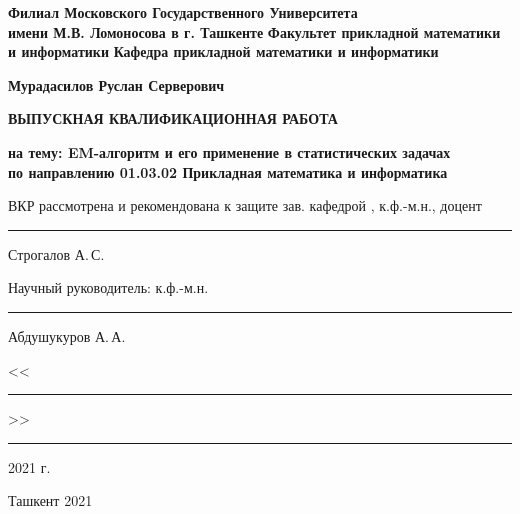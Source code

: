 \begin{titlepage}
\begin{center}
        
\textbf{Филиал Московского Государственного Университета\\
имени М.В. Ломоносова в г. Ташкенте} \vskip 0.3cm
\textbf{Факультет прикладной математики и информатики} \vskip 0.3cm
\textbf{Кафедра прикладной математики и информатики} \vskip 3cm
            
\textbf{Мурадасилов Руслан Серверович} \vskip 1cm
            
\textbf{ВЫПУСКНАЯ КВАЛИФИКАЦИОННАЯ РАБОТА} \vskip 1cm
            
\normalsize { \textbf{на тему: \guillemotleft EM-алгоритм и его применение в статистических задачах\guillemotright \\ \vskip 0.5cm
по направлению 01.03.02 \guillemotleft Прикладная математика и информатика\guillemotright} }
\vskip 1.5cm
\end{center}

\begin{flushleft}
ВКР рассмотрена и рекомендована к защите \vskip 5pt
зав. кафедрой \guillemotright, к.ф.-м.н., доцент\rule{3.2cm}{0.5pt} Строгалов А.\,С.
\end{flushleft}
\begin{flushleft}
Научный руководитель:\vskip 5pt
к.ф.-м.н. \rule{9.5cm}{0.5pt} Абдушукуров А.\,А.
\end{flushleft}
          
\begin{flushright}
<<\rule{1cm}{0.5pt}>>\rule{3.5cm}{0.5pt} 2021 г.
\end{flushright}
        
\vfill   
\begin{center}
Ташкент 2021
\end{center}
\end{titlepage}